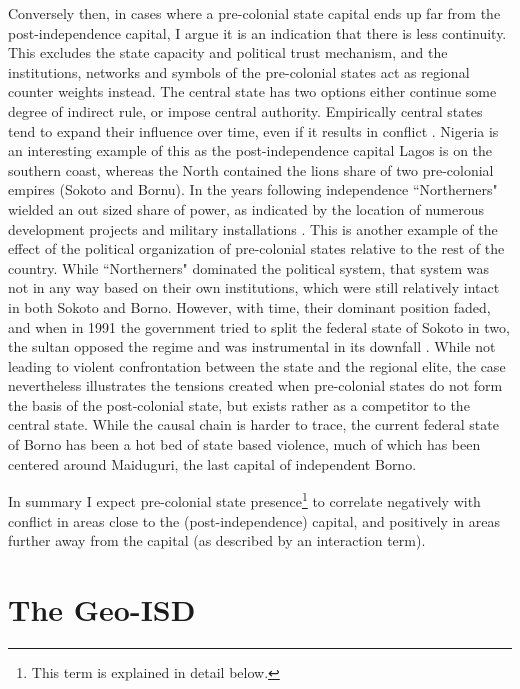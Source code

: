 \documentclass[12pt]{article}
\begin{document}
Conversely then, in cases where a pre-colonial state capital ends up far from
the post-independence capital, I argue it is an indication that there is less
continuity. This excludes the state capacity and political trust mechanism, and
the institutions, networks and symbols of the pre-colonial states act as
regional counter weights instead. The central state has two options either
continue some degree of indirect rule, or impose central authority. Empirically
central states tend to expand their influence over time, even if it results in
conflict \citep{Ying_2020}. Nigeria is an interesting example of this as the
post-independence capital Lagos is on the southern coast, whereas the North
contained the lions share of two pre-colonial empires (Sokoto and
Bornu). In the years following independence ``Northerners" wielded an out sized
share of power, as indicated by the location of numerous development projects
and military installations \citep{Bates2008a}. This is another example of the
effect of the political organization of pre-colonial states relative to the rest
of the country. While ``Northerners" dominated the political system, that system
was not in any way based on their own institutions, which were still relatively
intact in both Sokoto and Borno. However, with time, their dominant position
faded, and when in 1991 the government tried to split the federal state of
Sokoto in two, the sultan opposed the regime and was instrumental in its
downfall \citep{HiribarrenVincent2017AHoB}. While not leading to violent
confrontation between the state and the regional elite, the case nevertheless
illustrates the tensions created when pre-colonial states do not form the basis
of the post-colonial state, but exists rather as a competitor to the central
state. While the causal chain is harder to trace, the current federal state of
Borno has been a hot bed of state based violence, much of which has been
centered around Maiduguri, the last capital of independent Borno.

In summary I expect pre-colonial state presence\footnote{This term is explained
in detail below.} to correlate negatively with conflict in areas close to the
(post-independence) capital, and positively in areas further away from the
capital (as described by an interaction term).

\section{The Geo-ISD}
\end{document}
